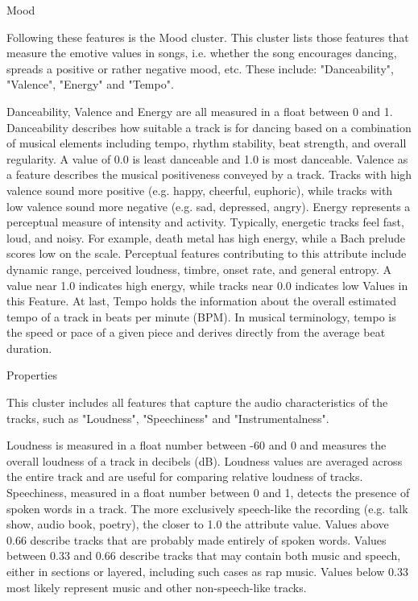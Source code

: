 Mood

Following these features is the Mood cluster.
This cluster lists those features that measure the emotive values in songs, 
i.e. whether the song encourages dancing, spreads a positive or rather negative mood,
etc. These include: "Danceability", "Valence", "Energy" and "Tempo".

Danceability, Valence and Energy are all measured in a float between 0 and 1. 
Danceability describes how suitable a track is for dancing based on a combination of musical elements
including tempo, rhythm stability, beat strength, and overall regularity. 
A value of 0.0 is least danceable and 1.0 is most danceable.
Valence as a feature describes the musical positiveness conveyed by a track. 
Tracks with high valence sound more positive (e.g. happy, cheerful, euphoric),
while tracks with low valence sound more negative (e.g. sad, depressed, angry).  
Energy represents a perceptual measure of intensity and activity.
Typically, energetic tracks feel fast, loud, and noisy. 
For example, death metal has high energy, while a Bach prelude scores low on the scale.
Perceptual features contributing to this attribute include dynamic range, 
perceived loudness, timbre, onset rate, and general entropy. A value near 1.0 indicates high energy,
while tracks near 0.0 indicates low Values in this Feature. 
At last, Tempo holds the information about the overall estimated tempo of a track in beats per
minute (BPM). 
In musical terminology, tempo is the speed or pace of a given piece and derives directly from the
average beat duration.

Properties

This cluster includes all features that capture the audio characteristics of the tracks,
such as "Loudness", "Speechiness" and "Instrumentalness".

Loudness is measured in a float number between -60 and 0 and measures the overall loudness
of a track in decibels (dB). 
Loudness values are averaged across the entire track and are useful for comparing relative
loudness of tracks. 
Speechiness, measured in a float number between 0 and 1, detects the presence of spoken words in a track. 
The more exclusively speech-like the recording (e.g. talk show, audio book, poetry),
the closer to 1.0 the attribute value. 
Values above 0.66 describe tracks that are probably made entirely of spoken words.
Values between 0.33 and 0.66 describe tracks that may contain both music and speech, 
either in sections or layered, including such cases as rap music.
Values below 0.33 most likely represent music and other non-speech-like tracks. 

